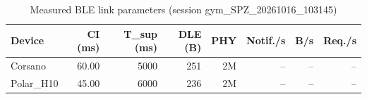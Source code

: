 \begin{table}[t]
\caption{Measured BLE link parameters (session gym_SPZ_20261016_103145)}
\label{tab:link-params}
\centering
\scriptsize
\setlength{\tabcolsep}{3pt}
\begin{tabular}{lrrrrrrr}
\toprule
\textbf{Device} & \textbf{CI (ms)} & \textbf{T_sup (ms)} & \textbf{DLE (B)} & \textbf{PHY} & \textbf{Notif./s} & \textbf{B/s} & \textbf{Req./s} \\
\midrule
Corsano & 60.00 & 5000 & 251 & 2M & -- & -- & -- \\
Polar\_H10 & 45.00 & 6000 & 236 & 2M & -- & -- & -- \\
\bottomrule
\end{tabular}
\end{table}
